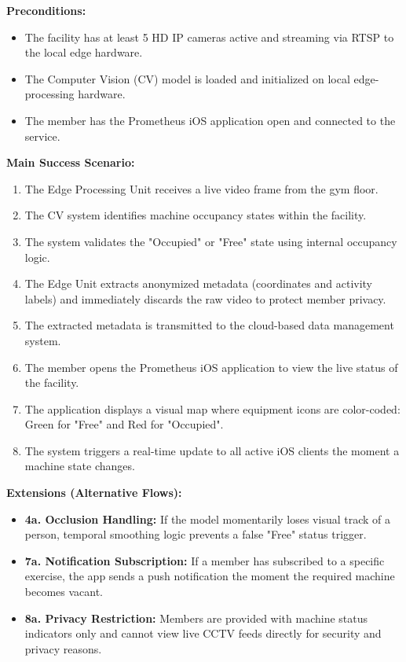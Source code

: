 \textbf{Preconditions:}
\begin{itemize}
    \item The facility has at least 5 HD IP cameras active and streaming via RTSP to the local edge hardware.
    \item The Computer Vision (CV) model is loaded and initialized on local edge-processing hardware.
    \item The member has the Prometheus iOS application open and connected to the service.
\end{itemize}

\textbf{Main Success Scenario:}
\begin{enumerate}
    \item The Edge Processing Unit receives a live video frame from the gym floor.
    \item The CV system identifies machine occupancy states within the facility.
    \item The system validates the "Occupied" or "Free" state using internal occupancy logic.
    \item The Edge Unit extracts anonymized metadata (coordinates and activity labels) and immediately discards the raw video to protect member privacy.
    \item The extracted metadata is transmitted to the cloud-based data management system.
    \item The member opens the Prometheus iOS application to view the live status of the facility.
    \item The application displays a visual map where equipment icons are color-coded: Green for "Free" and Red for "Occupied".
    \item The system triggers a real-time update to all active iOS clients the moment a machine state changes.
\end{enumerate}

\textbf{Extensions (Alternative Flows):}
\begin{itemize}
    \item \textbf{4a. Occlusion Handling:} If the model momentarily loses visual track of a person, temporal smoothing logic prevents a false "Free" status trigger.
    \item \textbf{7a. Notification Subscription:} If a member has subscribed to a specific exercise, the app sends a push notification the moment the required machine becomes vacant.
    \item \textbf{8a. Privacy Restriction:} Members are provided with machine status indicators only and cannot view live CCTV feeds directly for security and privacy reasons.
\end{itemize}

